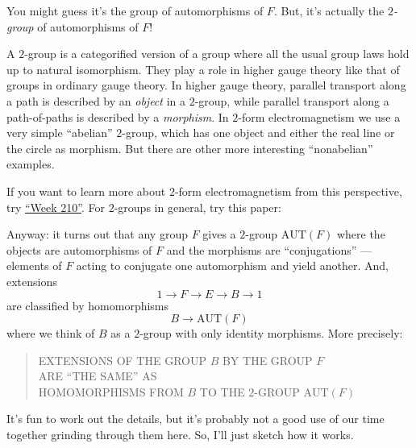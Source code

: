 \documentclass{article}
\def\tightlist{}
\renewcommand{\texttt}[1]{%
  \begingroup
  \ttfamily
  \begingroup\lccode`~=`/\lowercase{\endgroup\def~}{/\discretionary{}{}{}}%
  \begingroup\lccode`~=`[\lowercase{\endgroup\def~}{[\discretionary{}{}{}}%
  \begingroup\lccode`~=`.\lowercase{\endgroup\def~}{.\discretionary{}{}{}}%
  \catcode`/=\active\catcode`[=\active\catcode`.=\active
  \scantokens{#1\noexpand}%
  \endgroup
}
\begin{document}
You might guess it's the group of automorphisms of \(F\). But, it's
actually the \emph{\(2\)-group} of automorphisms of \(F\)!

A \(2\)-group is a categorified version of a group where all the usual
group laws hold up to natural isomorphism. They play a role in higher
gauge theory like that of groups in ordinary gauge theory. In higher
gauge theory, parallel transport along a path is described by an
\emph{object} in a \(2\)-group, while parallel transport along a
path-of-paths is described by a \emph{morphism}. In \(2\)-form
electromagnetism we use a very simple ``abelian'' \(2\)-group, which has
one object and either the real line or the circle as morphism. But there
are other more interesting ``nonabelian'' examples.

If you want to learn more about \(2\)-form electromagnetism from this
perspective, try \protect\hyperlink{week210}{``Week 210''}. For
\(2\)-groups in general, try this paper:


Anyway: it turns out that any group \(F\) gives a \(2\)-group
\(\mathrm{AUT}(F)\) where the objects are automorphisms of \(F\) and the
morphisms are ``conjugations'' --- elements of \(F\) acting to conjugate
one automorphism and yield another. And, extensions
\[1 \to F \to E \to B \to 1\] are classified by homomorphisms
\[B \to \mathrm{AUT}(F)\] where we think of \(B\) as a \(2\)-group with
only identity morphisms. More precisely:

\begin{quote}
EXTENSIONS OF THE GROUP \(B\) BY THE GROUP \(F\)\\
ARE ``THE SAME'' AS\\
HOMOMORPHISMS FROM \(B\) TO THE \(2\)-GROUP \(\mathrm{AUT}(F)\)
\end{quote}

It's fun to work out the details, but it's probably not a good use of
our time together grinding through them here. So, I'll just sketch how
it works.
\end{document}
